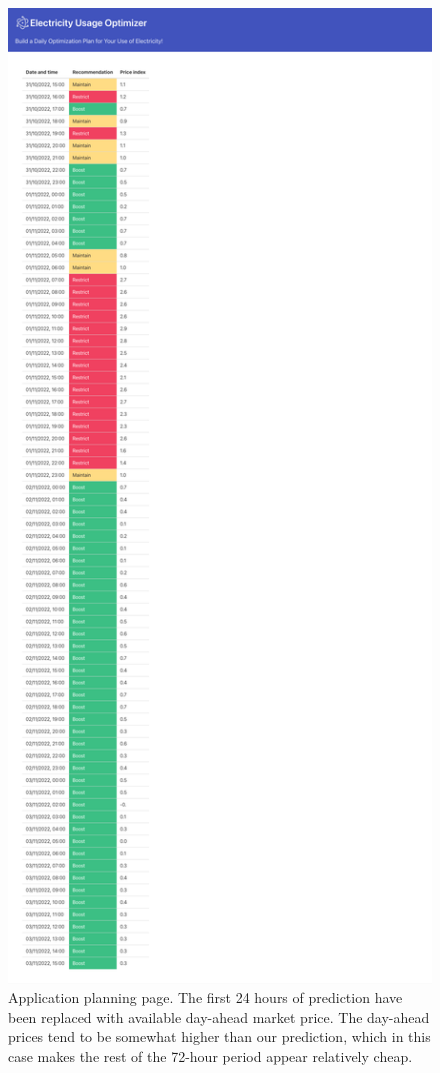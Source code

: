 \begin{figure}[H]
    \centering
    \includegraphics[height=0.9\textheight]{report/images/application-planning.png}
    \caption{Application planning page. The first 24 hours of prediction have been replaced with available day-ahead market price. The day-ahead prices tend to be somewhat higher than our prediction, which in this case makes the rest of the 72-hour period appear relatively cheap.}
    \label{fig:app-planning-page}
\end{figure}